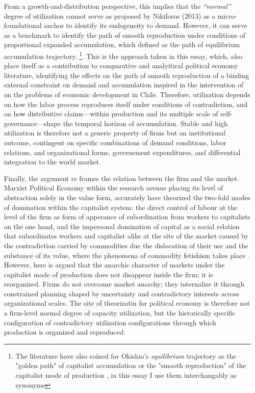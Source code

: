 From a growth-and-distribution perspective, this implies that the \emph{“normal”} degree of utilization cannot serve as proposed by Nikiforos (2013) as a micro-foundational anchor to identify its endogeneity to demand. However, it can serve as a benchmark to identify the path of smooth reproduction under conditions of proportional expanded accumulation, which \citet{Okishio2022} defined as the path of equilibrium accumulation trajectory. \footnote{The literature have also coined for Okishio's \emph{equilibrium} trajectory  as the "golden path" of capitalist accumulation \citet{Bergmann2009} or the "smooth reproduction" of the capitalist mode of production \citep{Basu2022}, in this essay I use them interchangably as synonyms}. This is the approach taken in this essay, which, also place itself as a contribution to comparative and analyitical political economy literature, identifying the effects on the path of smooth reproduction of a binding external constraint on demand and accumulation inspired in the intervention of \citet{Kaldor1959} on the problems of economic development in Chile. Therefore, utilization depends on how the labor process reproduces itself under conditions of contradiction, and on how distributive claims—within production and its multiple scale of self-governance—shape the temporal horizon of accumulation. Stable and high utilization is therefore not a generic property of firms but an  institutional outcome, contingent on specific combinations of demand conditions, labor relations, and organizational forms, governement expenditures, and differential integration to the world market.

Finally, the argument re frames the relation between the firm and the market. Marxist Political Economy within the research avenue placing its level of abstraction solely in the value form, accurately have theorized the two-fold modes of domination within the capitalist system: the direct control of labour at the level of the firm as form of apperance of subordination from workers to capitalists on the one hand, and the impersonal domination of capital as a social relation that subordinates workers and capitalist alike at the site of the market caused by the contradiction carried by commodities due the dislocation of their use and the substance of its value, where the phenomena of commodity fetishism takes place \citep{Basu2022}. However, here is argued that the anarchic character of  markets under the capitalist mode of production does not disappear inside the firm; it is reorganized. Firms do not overcome market anarchy; they internalize it through constrained planning shaped by uncertainty and contradictory interests across organizational scales. The site of theorizatin for political economy is therefore not a firm-level normal degree of capacity utilization, but the historically specific configuration of contradictory utilization configurations through which production is organized and reproduced.


